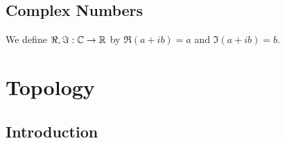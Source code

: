 \documentclass{book}
\begin{document}
	
	
	
	
	
	
	
	
	
	
	
	
	
	
	
	
	
	
	\section{Complex Numbers}
	
	We define $\Re, \Im: \mathbb{C} \rightarrow \mathbb{R}$ by $\Re(a + ib) = a$ and $\Im(a+ib) = b$.
	
	
	
	
	
	
	
	
	
	
	
	
	
	
	
	
	
	
	
	
	
	
	
	
	
	
	
	
	
	
	
	
	
	
	
	
	
	
	
	
	
	
	
	
	
	
	
	
	
	
	
	
	
	
	
	
	
	
	
	
	
	
	
	
	
	
	
	
	
	
	
	
	
	\newpage
	\chapter{Topology}
	
	\section{Introduction}
	
\end{document}
